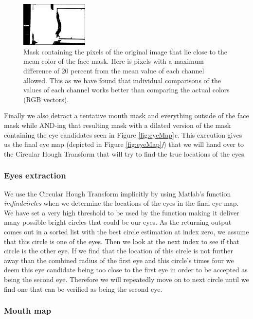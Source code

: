 \begin{figure}[H]
\centering
\includegraphics[width=0.3\textwidth]{img/fd2/averageFaceColorMask.png}
\caption{Mask containing the pixels of the original image that lie close to the mean color of the face mask. Here is pixels with a maximum difference of 20 percent from the mean value of each channel allowed. This as we have found that individual comparisons of the values of each channel works better than comparing the actual colors (RGB vectors).}
\label{fig:averageFaceColorMask}
\end{figure}

Finally we also detract a tentative mouth mask and everything outside of the face mask while AND-ing that resulting mask with a dilated version of the mask containing the eye candidates seen in Figure \ref{fig:eyeMap}\textit{e}. This execution gives us the final eye map (depicted in Figure \ref{fig:eyeMap}\textit{f}) that we will hand over to the Circular Hough Transform that will try to find the true locations of the eyes.

\subsubsection{Eyes extraction}

We use the Circular Hough Transform implicitly by using Matlab's function \textit{imfindcircles} when we determine the locations of the eyes in the final eye map. We have set a very high threshold to be used by the function making it deliver many possible bright circles that could be our eyes. As the returning output comes out in a sorted list with the best circle estimation at index zero, we assume that this circle is one of the eyes. Then we look at the next index to see if that circle is the other eye. If we find that the location of this circle is not further away than the combined radius of the first eye and this circle's times four we deem this eye candidate being too close to the first eye in order to be accepted as being the second eye. Therefore we will repeatedly move on to next circle until we find one that can be verified as being the second eye.

\subsubsection{Mouth map}


